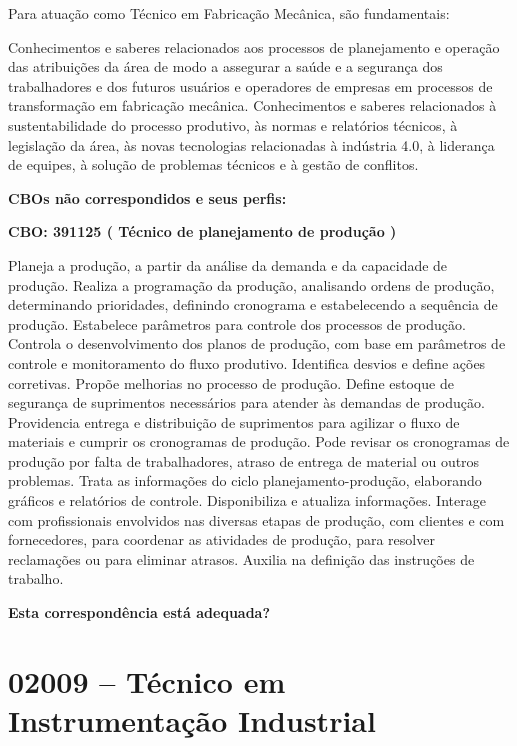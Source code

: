 \documentclass[
]{article}
\begin{document}
Para atuação como Técnico em Fabricação Mecânica, são fundamentais:

Conhecimentos e saberes relacionados aos processos de planejamento e
operação das atribuições da área de modo a assegurar a saúde e a
segurança dos trabalhadores e dos futuros usuários e operadores de
empresas em processos de transformação em fabricação mecânica.
Conhecimentos e saberes relacionados à sustentabilidade do processo
produtivo, às normas e relatórios técnicos, à legislação da área, às
novas tecnologias relacionadas à indústria 4.0, à liderança de equipes,
à solução de problemas técnicos e à gestão de conflitos.

\textbf{CBOs não correspondidos e seus perfis:}

\textbf{CBO: 391125  ( Técnico de planejamento de produção )}

Planeja a produção, a partir da análise da demanda e da capacidade de
produção. Realiza a programação da produção, analisando ordens de
produção, determinando prioridades, definindo cronograma e estabelecendo
a sequência de produção. Estabelece parâmetros para controle dos
processos de produção. Controla o desenvolvimento dos planos de
produção, com base em parâmetros de controle e monitoramento do fluxo
produtivo. Identifica desvios e define ações corretivas. Propõe
melhorias no processo de produção. Define estoque de segurança de
suprimentos necessários para atender às demandas de produção.
Providencia entrega e distribuição de suprimentos para agilizar o fluxo
de materiais e cumprir os cronogramas de produção. Pode revisar os
cronogramas de produção por falta de trabalhadores, atraso de entrega de
material ou outros problemas. Trata as informações do ciclo
planejamento-produção, elaborando gráficos e relatórios de controle.
Disponibiliza e atualiza informações. Interage com profissionais
envolvidos nas diversas etapas de produção, com clientes e com
fornecedores, para coordenar as atividades de produção, para resolver
reclamações ou para eliminar atrasos. Auxilia na definição das
instruções de trabalho.

\begin{Form}
\textbf{Esta correspondência está adequada?} \\ 
\end{Form}

\newpage
\section{ 02009 -- Técnico em Instrumentação Industrial }
\end{document}
